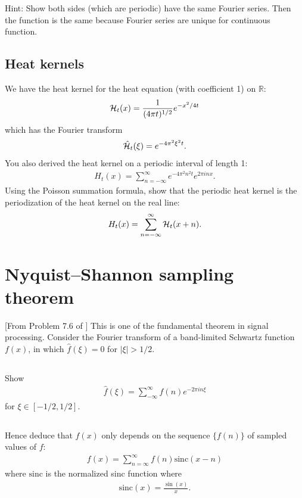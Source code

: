 \documentclass[11pt,letterpaper]{article}
\begin{document}
Hint: Show both sides (which are periodic) have the same Fourier series. Then the function is the same because Fourier series are unique for continuous function.

\subsection{Heat kernels} We have the heat kernel for the heat equation (with coefficient 1) on $\mathbb{R}$:
\begin{align}
    \mathcal{H}_t(x) = \frac{1}{(4\pi t)^{1/2}}e^{-x^2/4t}
\end{align}
which has the Fourier transform
\begin{align}
    \hat{\mathcal{H}}_t(\xi) = e^{-4\pi^2 \xi^2 t}.
\end{align}
You also derived the heat kernel on a periodic interval of length 1:
\begin{align}
    H_t(x) = \sum_{n=-\infty}^\infty e^{-4\pi^2 n^2 t}e^{2\pi inx}.
\end{align}
Using the Poisson summation formula, show that the periodic heat kernel is the periodization of the
heat kernel on the real line:
\begin{align}
    H_t(x) = \sum_{n=-\infty}^\infty \mathcal{H}_t(x+n).
\end{align}

\section{Nyquist–Shannon sampling theorem}
[From Problem 7.6 of \cite{ShearerLevy_15}] This is one of the fundamental theorem in signal processing. Consider the Fourier transform of a band-limited Schwartz function $f(x)$, in which $\hat f(\xi) = 0$ for $|\xi|>1/2$. 

\subsection{}
Show
\begin{align}
    \hat{f}(\xi)=\sum_{-\infty}^\infty f(n)e^{-2\pi in \xi}
\end{align}
for $\xi\in [-1/2, 1/2]$. 

\subsection{}
Hence deduce that $f(x)$ only depends on the sequence $\{f(n)\}$ of sampled values of $f$:
\begin{align}
    f(x) = \sum_{n=\infty}^\infty f(n) \text{sinc}(x-n)\label{eq:WhSh_form}
\end{align}
where $\text{sinc}$ is the normalized sinc function where
\begin{align}
    \text{sinc}(x) = \frac{\sin(x)}{x}.
\end{align}
\end{document}
